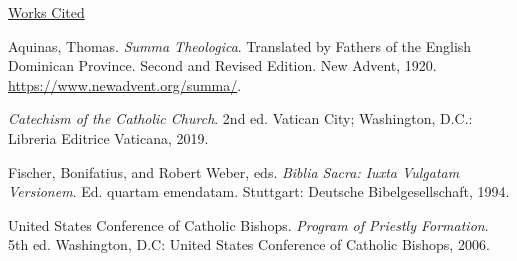 \documentclass[
    12pt,
    letterpaper,
    oneside,
    noraggedright
]{turabian-researchpaper}
\newlength{\cslhangindent}
\newenvironment{CSLReferences}[2]
 {
\newpage %
\centerline{\underline{Works Cited}} %
 \setlength{\parindent}{0pt}
 \singlespacing
  \let\oldpar\par
  \def\par{\hangindent=\cslhangindent\oldpar}
  \setlength{\parskip}{1em}
 }
{
}
\begin{document}
\hypertarget{refs}{}
\begin{CSLReferences}{1}{0}
\leavevmode{}%
Aquinas, Thomas. \emph{Summa Theologica}. Translated by Fathers of the
English Dominican Province. Second and Revised Edition. New Advent,
1920. \url{https://www.newadvent.org/summa/}.

\leavevmode{}%
\emph{Catechism of the Catholic Church}. 2nd ed. Vatican City;
Washington, D.C.: Libreria Editrice Vaticana, 2019.

\leavevmode{}%
Fischer, Bonifatius, and Robert Weber, eds. \emph{Biblia Sacra: Iuxta
Vulgatam Versionem}. Ed. quartam emendatam. Stuttgart: Deutsche
Bibelgesellschaft, 1994.

\leavevmode{}%
United States Conference of Catholic Bishops. \emph{Program of Priestly
Formation}. 5th ed. Washington, D.C: United States Conference of
Catholic Bishops, 2006.

\end{CSLReferences}
\end{document}
